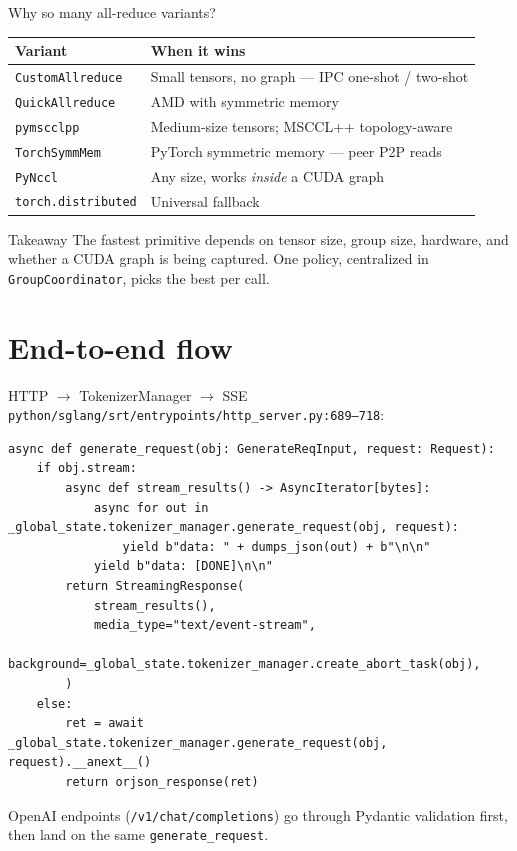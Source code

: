 \documentclass[aspectratio=169,10pt]{beamer}
\begin{document}
\begin{frame}{Why so many all-reduce variants?}
  \footnotesize
  \begin{tabular}{p{3cm} p{9.2cm}}
    \toprule
    \textbf{Variant} & \textbf{When it wins} \\
    \midrule
    \texttt{CustomAllreduce}    & Small tensors, no graph --- IPC one-shot / two-shot \\
    \texttt{QuickAllreduce}     & AMD with symmetric memory \\
    \texttt{pymscclpp}          & Medium-size tensors; MSCCL++ topology-aware \\
    \texttt{TorchSymmMem}       & PyTorch symmetric memory --- peer P2P reads \\
    \texttt{PyNccl}             & Any size, works \emph{inside} a CUDA graph \\
    \texttt{torch.distributed}  & Universal fallback \\
    \bottomrule
  \end{tabular}
  \vspace{0.4cm}
  \begin{block}{Takeaway}
    \small
    The fastest primitive depends on tensor size, group size, hardware, and whether a CUDA graph
    is being captured. One policy, centralized in \texttt{GroupCoordinator}, picks the best per call.
  \end{block}
\end{frame}

\section{End-to-end flow}

\begin{frame}[fragile]{HTTP $\to$ TokenizerManager $\to$ SSE}
  \footnotesize
  \texttt{python/sglang/srt/entrypoints/http\_server.py:689--718}:
\begin{lstlisting}
async def generate_request(obj: GenerateReqInput, request: Request):
    if obj.stream:
        async def stream_results() -> AsyncIterator[bytes]:
            async for out in _global_state.tokenizer_manager.generate_request(obj, request):
                yield b"data: " + dumps_json(out) + b"\n\n"
            yield b"data: [DONE]\n\n"
        return StreamingResponse(
            stream_results(),
            media_type="text/event-stream",
            background=_global_state.tokenizer_manager.create_abort_task(obj),
        )
    else:
        ret = await _global_state.tokenizer_manager.generate_request(obj, request).__anext__()
        return orjson_response(ret)
\end{lstlisting}
  OpenAI endpoints (\texttt{/v1/chat/completions}) go through Pydantic validation first, then land on the same \texttt{generate\_request}.
\end{frame}
\end{document}

